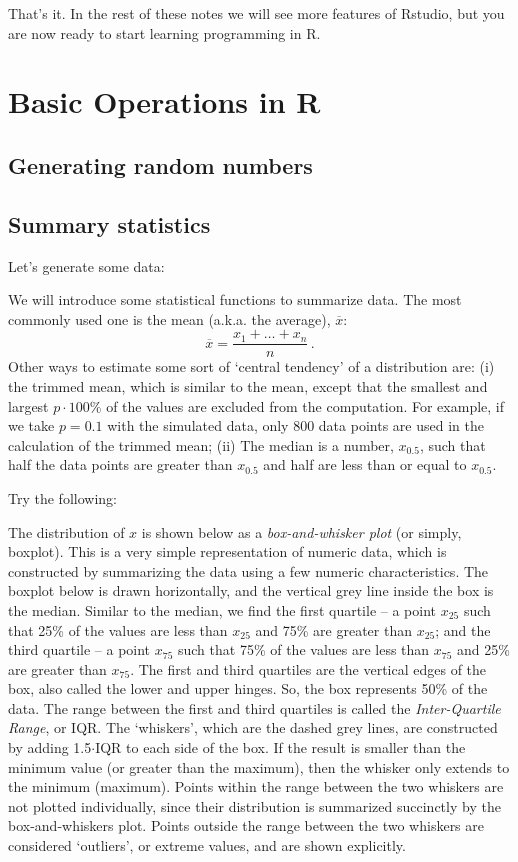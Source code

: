 That's it. In the rest of these notes we will see more features of Rstudio, but you are now ready to start learning programming in R.


\section{Basic Operations in R}
\subsection{Generating random numbers}



\subsection{Summary statistics}
Let's generate some data:


We will introduce some statistical functions to summarize data. The most commonly used one is the mean (a.k.a. the average), $\overline{x}$:\\
$$\overline{x}=\frac{x_1+\ldots+x_n}{n}\,.$$
Other ways to estimate some sort of `central tendency' of a distribution are:
 (i) the trimmed mean, which is similar to the mean, except that the smallest and largest $p\cdot 100\%$  of the values are excluded from the computation. For example, if we take $p=0.1$ with the simulated data, only 800 data points are used in the calculation of the trimmed mean; (ii) The median is a number, $x_{0.5}$, such that half the data points are greater than $x_{0.5}$ and half are less than or equal to $x_{0.5}$. 

Try the following:


The distribution of $x$ is shown below as a \textit{box-and-whisker plot} (or simply, boxplot). This is a very simple representation of numeric data, which is constructed by summarizing the data using a few numeric characteristics. The boxplot below is drawn horizontally, and the vertical grey line inside the box is the median. Similar to the median, we find the first quartile -- a point $x_{25}$ such that 25\% of the values are less than $x_{25}$ and 75\% are greater than $x_{25}$; and the third quartile -- a point $x_{75}$ such that 75\% of the values are less than $x_{75}$ and 25\% are greater than $x_{75}$. The first and third quartiles are the vertical edges of the box, also called the lower and upper hinges. So, the box represents 50\% of the data. The range between the first and third quartiles is called the \textit{Inter-Quartile Range}, or IQR.
The `whiskers', which are the dashed grey lines, are constructed by adding 1.5$\cdot$IQR to each side of the box. If the result is smaller than the minimum value (or greater than the maximum), then the whisker only extends to the minimum (maximum). Points within the range between the two whiskers are not plotted individually, since their distribution is summarized succinctly by the box-and-whiskers plot. Points outside the range between the two whiskers are considered `outliers', or extreme values, and are shown explicitly. 


